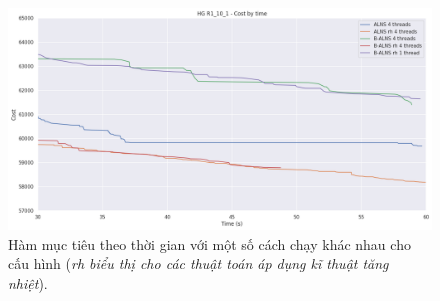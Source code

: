 \begin{figure}[H] %
  \centering %
  \includegraphics[width=1\textwidth]{figures/cost_time_R1_10_1_rh.png} 
  \caption{Hàm mục tiêu theo thời gian với một số cách chạy khác nhau cho cấu hình  (\textit{rh biểu thị cho các thuật toán áp dụng kĩ thuật tăng nhiệt}).} 
  \label{fig:reheat1}
\end{figure}